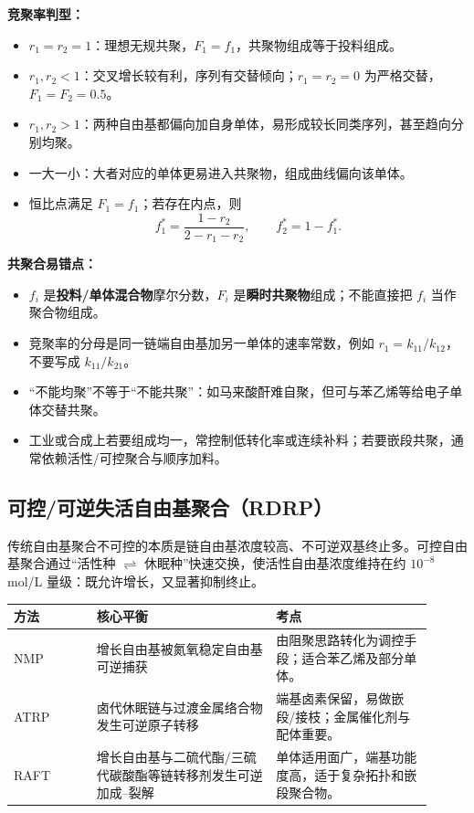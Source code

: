 \documentclass[UTF8,a4paper,10pt,twocolumn]{ctexart}
\begin{document}
\begin{exam}
  \textbf{竞聚率判型：}
  \begin{itemize}
    \item $r_1=r_2=1$：理想无规共聚，$F_1=f_1$，共聚物组成等于投料组成。
    \item $r_1,r_2<1$：交叉增长较有利，序列有交替倾向；$r_1=r_2=0$ 为严格交替，$F_1=F_2=0.5$。
    \item $r_1,r_2>1$：两种自由基都偏向加自身单体，易形成较长同类序列，甚至趋向分别均聚。
    \item 一大一小：大者对应的单体更易进入共聚物，组成曲线偏向该单体。
    \item 恒比点满足 $F_1=f_1$；若存在内点，则
      \[
        f_1^\ast=\frac{1-r_2}{2-r_1-r_2},\qquad f_2^\ast=1-f_1^\ast.
      \]
  \end{itemize}
\end{exam}

\begin{pitfall}
  \textbf{共聚合易错点：}
  \begin{itemize}
    \item $f_i$ 是\textbf{投料/单体混合物}摩尔分数，$F_i$ 是\textbf{瞬时共聚物}组成；不能直接把 $f_i$ 当作聚合物组成。
    \item 竞聚率的分母是同一链端自由基加另一单体的速率常数，例如 $r_1=k_{11}/k_{12}$，不要写成 $k_{11}/k_{21}$。
    \item “不能均聚”不等于“不能共聚”：如马来酸酐难自聚，但可与苯乙烯等给电子单体交替共聚。
    \item 工业或合成上若要组成均一，常控制低转化率或连续补料；若要嵌段共聚，通常依赖活性/可控聚合与顺序加料。
  \end{itemize}
\end{pitfall}

\subsection{可控/可逆失活自由基聚合（RDRP）}
传统自由基聚合不可控的本质是链自由基浓度较高、不可逆双基终止多。可控自由基聚合通过“活性种 $\rightleftharpoons$ 休眠种”快速交换，使活性自由基浓度维持在约 $10^{-8}$ mol/L 量级：既允许增长，又显著抑制终止。
\begin{center}
  \scriptsize
  \begin{tabularx}{\linewidth}{p{0.18\linewidth}p{0.39\linewidth}p{0.34\linewidth}}
    \toprule
    方法   & 核心平衡                             & 考点                          \\
    \midrule
    NMP  & 增长自由基被氮氧稳定自由基可逆捕获                & 由阻聚思路转化为调控手段；适合苯乙烯及部分单体。    \\
    ATRP & 卤代休眠链与过渡金属络合物发生可逆原子转移            & 端基卤素保留，易做嵌段/接枝；金属催化剂与配体重要。  \\
    RAFT & 增长自由基与二硫代酯/三硫代碳酸酯等链转移剂发生可逆加成--裂解 & 单体适用面广，端基功能度高，适于复杂拓扑和嵌段聚合物。 \\
    \bottomrule
  \end{tabularx}
\end{center}
\end{document}
